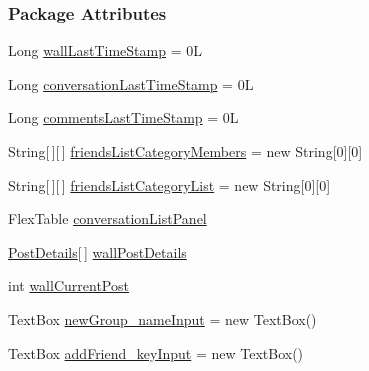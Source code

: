\subsubsection*{Package Attributes}
\begin{DoxyCompactItemize}
\item 
Long \hyperlink{classballmerpeak_1_1turtlenet_1_1client_1_1frontend_a0ae0ed364ab749ea18cf1e45d64e1db7}{wall\-Last\-Time\-Stamp} = 0\-L
\item 
Long \hyperlink{classballmerpeak_1_1turtlenet_1_1client_1_1frontend_a97ea23587c248a189f579102c29a0fc9}{conversation\-Last\-Time\-Stamp} = 0\-L
\item 
Long \hyperlink{classballmerpeak_1_1turtlenet_1_1client_1_1frontend_a7a4a64b5a06ff541b6a7112f852833b3}{comments\-Last\-Time\-Stamp} = 0\-L
\item 
String\mbox{[}$\,$\mbox{]}\mbox{[}$\,$\mbox{]} \hyperlink{classballmerpeak_1_1turtlenet_1_1client_1_1frontend_a5f5b375a148f003db1813758020730d6}{friends\-List\-Category\-Members} = new String\mbox{[}0\mbox{]}\mbox{[}0\mbox{]}
\item 
String\mbox{[}$\,$\mbox{]}\mbox{[}$\,$\mbox{]} \hyperlink{classballmerpeak_1_1turtlenet_1_1client_1_1frontend_af616e8f4d9c96bac48b8f997004cc385}{friends\-List\-Category\-List} = new String\mbox{[}0\mbox{]}\mbox{[}0\mbox{]}
\item 
Flex\-Table \hyperlink{classballmerpeak_1_1turtlenet_1_1client_1_1frontend_ad41191c45ac70b949585a24904a7f83a}{conversation\-List\-Panel}
\item 
\hyperlink{classballmerpeak_1_1turtlenet_1_1shared_1_1PostDetails}{Post\-Details}\mbox{[}$\,$\mbox{]} \hyperlink{classballmerpeak_1_1turtlenet_1_1client_1_1frontend_ad30f8befb0a4b2cf165bc34cf608866a}{wall\-Post\-Details}
\item 
int \hyperlink{classballmerpeak_1_1turtlenet_1_1client_1_1frontend_a1b40bc19faaffa4cb67380121d04b980}{wall\-Current\-Post}
\item 
Text\-Box \hyperlink{classballmerpeak_1_1turtlenet_1_1client_1_1frontend_a4516ddce9452d891a12579a0978b130f}{new\-Group\-\_\-name\-Input} = new Text\-Box()
\item 
Text\-Box \hyperlink{classballmerpeak_1_1turtlenet_1_1client_1_1frontend_ac072bb18cdb345b4d25181ed105b4468}{add\-Friend\-\_\-key\-Input} = new Text\-Box()
\end{DoxyCompactItemize}
